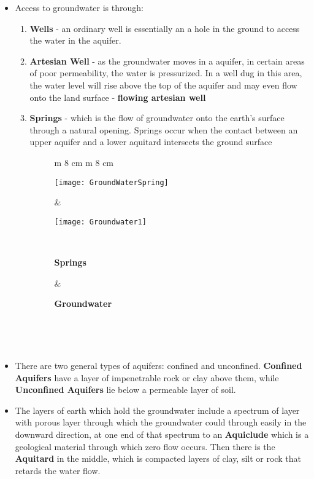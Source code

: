 \begin{itemize}
\item Access to groundwater is through:
\begin{enumerate}
\item \textbf{Wells}  - an ordinary well is essentially an a hole in the ground to access the water in the aquifer.
\item \textbf{Artesian Well} - as the groundwater moves in a aquifer, in certain areas of poor permeability, the water is pressurized.  In a well dug in this area, the water level will rise above the top of the aquifer and may even flow onto the land surface - {\textbf{flowing artesian well}}
\item \textbf{Springs}  - which is the flow of groundwater onto the earth's surface through a natural opening.  Springs occur when the contact between an upper aquifer and a lower aquitard intersects the ground surface
\begin{figure}[h]
\begin{tabular}{  m {8 cm}  m {8 cm} } 
\begin{center} \texttt{[image: GroundWaterSpring]} \end{center} & \begin{center}\texttt{[image: Groundwater1]} \end{center}\\
\begin{center} \textbf{Springs} \end{center} & \begin{center}\textbf{Groundwater} \end{center}\\
\end{tabular}\\
\end{figure}
\end{enumerate}
\item There are two general types of aquifers: confined and unconfined. \textbf{Confined Aquifers} have a layer of impenetrable rock or clay above them, while \textbf{Unconfined Aquifers} lie below a permeable layer of soil.
\item The layers of earth which hold the groundwater include a spectrum of layer with porous layer through which the groundwater could through easily in the downward direction, at one end of that spectrum to an \textbf{Aquiclude} which is a geological material through which zero flow occurs.
Then there is the \textbf{Aquitard}  in the middle, which is compacted layers of clay, silt or rock that retards the water flow.

\end{itemize}
